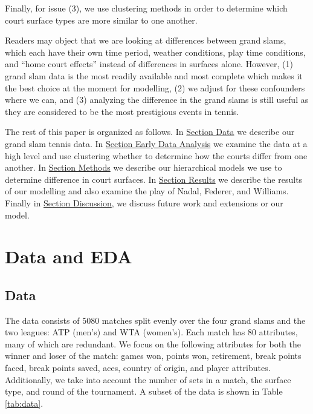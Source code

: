 \documentclass[]{article}
\begin{document}
Finally, for issue (3), we use clustering methods in order to determine
which court surface types are more similar to one another.

Readers may object that we are looking at differences between grand
slams, which each have their own time period, weather conditions, play
time conditions, and ``home court effects'' instead of differences in
surfaces alone. However, (1) grand slam data is the most readily
available and most complete which makes it the best choice at the moment
for modelling, (2) we adjust for these confounders where we can, and (3)
analyzing the difference in the grand slams is still useful as they are
considered to be the most prestigious events in tennis.

The rest of this paper is organized as follows. In
\protect\hyperlink{sec:data}{Section Data} we describe our grand slam
tennis data. In \protect\hyperlink{sec:eda}{Section Early Data Analysis}
we examine the data at a high level and use clustering whether to
determine how the courts differ from one another. In
\protect\hyperlink{sec:methods}{Section Methods} we describe our
hierarchical models we use to determine difference in court surfaces. In
\protect\hyperlink{sec:results}{Section Results} we describe the results
of our modelling and also examine the play of Nadal, Federer, and
Williams. Finally in \protect\hyperlink{discussion}{Section Discussion},
we discuss future work and extensions or our model.

\section{Data and EDA}\label{sec:data-eda}

\hypertarget{sec:data}{\subsection{Data}\label{sec:data}}

The data consists of 5080 matches split evenly over the four grand slams
and the two leagues: ATP (men's) and WTA (women's). Each match has 80
attributes, many of which are redundant. We focus on the following
attributes for both the winner and loser of the match: games won, points
won, retirement, break points faced, break points saved, aces, country
of origin, and player attributes. Additionally, we take into account the
number of sets in a match, the surface type, and round of the
tournament. A subset of the data is shown in Table \ref{tab:data}.
\end{document}
